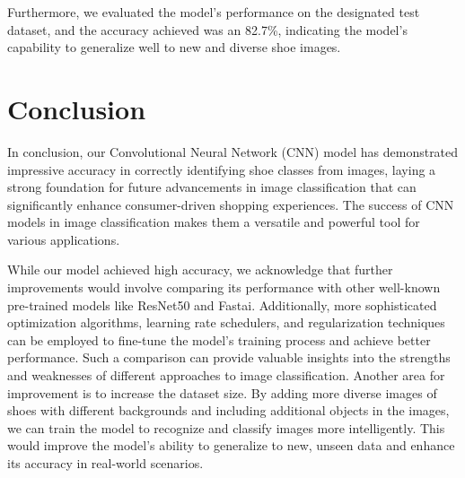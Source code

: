 \documentclass[11pt,a4paper]{article}
\begin{document}
\begin{table}[h!]
\centering
{}
\caption{Result of Model Training and Validation Accuracy After Additional Layers with Epochs}
\label{tab:refined_train_loss}
\end{table}

Furthermore, we evaluated the model's performance on the designated test dataset, and the accuracy achieved was an 82.7\%, indicating the model's capability to generalize well to new and diverse shoe images.

\section{Conclusion}
In conclusion, our Convolutional Neural Network (CNN) model has demonstrated impressive accuracy in correctly identifying shoe classes from images, laying a strong foundation for future advancements in image classification that can significantly enhance consumer-driven shopping experiences. The success of CNN models in image classification makes them a versatile and powerful tool for various applications.


\noindent While our model achieved high accuracy, we acknowledge that further improvements would involve comparing its performance with other well-known pre-trained models like ResNet50 and Fastai. Additionally, more sophisticated optimization algorithms, learning rate schedulers, and regularization techniques can be employed to fine-tune the model's training process and achieve better performance. Such a comparison can provide valuable insights into the strengths and weaknesses of different approaches to image classification. Another area for improvement is to increase the dataset size. By adding more diverse images of shoes with different backgrounds and including additional objects in the images, we can train the model to recognize and classify images more intelligently. This would improve the model's ability to generalize to new, unseen data and enhance its accuracy in real-world scenarios.
\end{document}
